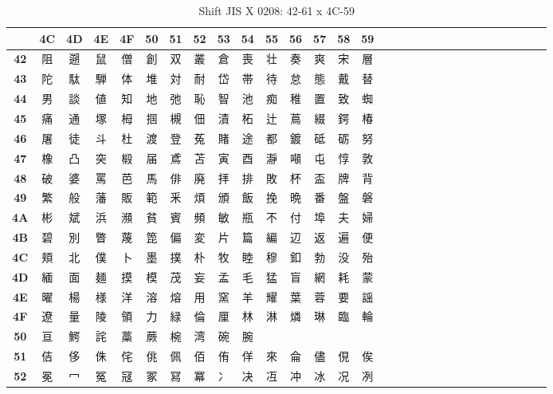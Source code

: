 \begin{table}[H]
\Fontified
\centering
\caption{Shift JIS X 0208: 42-61 x 4C-59}
\begin{tabular}{|Sc|Sc|Sc|Sc|Sc|Sc|Sc|Sc|Sc|Sc|Sc|Sc|Sc|Sc|Sc|}
\hline
 & \textbf{4C} & \textbf{4D} & \textbf{4E} & \textbf{4F} & \textbf{50} & \textbf{51} & \textbf{52} & \textbf{53} & \textbf{54} & \textbf{55} & \textbf{56} & \textbf{57} & \textbf{58} & \textbf{59} \\ \hline
\textbf{42} & 阻 & 遡 & 鼠 & 僧 & 創 & 双 & 叢 & 倉 & 喪 & 壮 & 奏 & 爽 & 宋 & 層 \\ \hline
\textbf{43} & 陀 & 駄 & 騨 & 体 & 堆 & 対 & 耐 & 岱 & 帯 & 待 & 怠 & 態 & 戴 & 替 \\ \hline
\textbf{44} & 男 & 談 & 値 & 知 & 地 & 弛 & 恥 & 智 & 池 & 痴 & 稚 & 置 & 致 & 蜘 \\ \hline
\textbf{45} & 痛 & 通 & 塚 & 栂 & 掴 & 槻 & 佃 & 漬 & 柘 & 辻 & 蔦 & 綴 & 鍔 & 椿 \\ \hline
\textbf{46} & 屠 & 徒 & 斗 & 杜 & 渡 & 登 & 菟 & 賭 & 途 & 都 & 鍍 & 砥 & 砺 & 努 \\ \hline
\textbf{47} & 橡 & 凸 & 突 & 椴 & 届 & 鳶 & 苫 & 寅 & 酉 & 瀞 & 噸 & 屯 & 惇 & 敦 \\ \hline
\textbf{48} & 破 & 婆 & 罵 & 芭 & 馬 & 俳 & 廃 & 拝 & 排 & 敗 & 杯 & 盃 & 牌 & 背 \\ \hline
\textbf{49} & 繁 & 般 & 藩 & 販 & 範 & 釆 & 煩 & 頒 & 飯 & 挽 & 晩 & 番 & 盤 & 磐 \\ \hline
\textbf{4A} & 彬 & 斌 & 浜 & 瀕 & 貧 & 賓 & 頻 & 敏 & 瓶 & 不 & 付 & 埠 & 夫 & 婦 \\ \hline
\textbf{4B} & 碧 & 別 & 瞥 & 蔑 & 箆 & 偏 & 変 & 片 & 篇 & 編 & 辺 & 返 & 遍 & 便 \\ \hline
\textbf{4C} & 頬 & 北 & 僕 & 卜 & 墨 & 撲 & 朴 & 牧 & 睦 & 穆 & 釦 & 勃 & 没 & 殆 \\ \hline
\textbf{4D} & 緬 & 面 & 麺 & 摸 & 模 & 茂 & 妄 & 孟 & 毛 & 猛 & 盲 & 網 & 耗 & 蒙 \\ \hline
\textbf{4E} & 曜 & 楊 & 様 & 洋 & 溶 & 熔 & 用 & 窯 & 羊 & 耀 & 葉 & 蓉 & 要 & 謡 \\ \hline
\textbf{4F} & 遼 & 量 & 陵 & 領 & 力 & 緑 & 倫 & 厘 & 林 & 淋 & 燐 & 琳 & 臨 & 輪 \\ \hline
\textbf{50} & 亘 & 鰐 & 詫 & 藁 & 蕨 & 椀 & 湾 & 碗 & 腕 &  &  &  &  &  \\ \hline
\textbf{51} & 佶 & 侈 & 侏 & 侘 & 佻 & 佩 & 佰 & 侑 & 佯 & 來 & 侖 & 儘 & 俔 & 俟 \\ \hline
\textbf{52} & 冕 & 冖 & 冤 & 冦 & 冢 & 冩 & 冪 & 冫 & 决 & 冱 & 冲 & 冰 & 况 & 冽 \\ \hline

\end{tabular}
\end{table}
